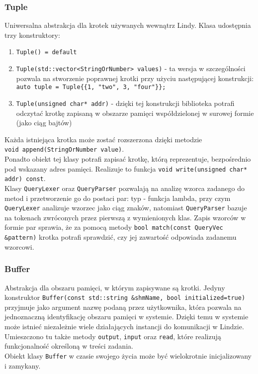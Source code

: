 \documentclass[a4paper]{article}
\begin{document}
	\subsubsection{Tuple}
	Uniwersalna abstrakcja dla krotek używanych wewnątrz Lindy. Klasa udostępnia trzy konstruktory: \\
	\begin{enumerate}
		\item \texttt{Tuple() = default}
		\item \texttt{Tuple(std::vector<StringOrNumber> values)} - ta wersja w szczególności pozwala na stworzenie poprawnej krotki przy użyciu następującej konstrukcji: \texttt{auto tuple = Tuple\{\{1, "two", 3, "four"\}\};}
		\item \texttt{Tuple(unsigned char* addr)} - dzięki tej konstrukcji biblioteka potrafi odczytać krotkę zapisaną w obszarze pamięci współdzielonej w surowej formie (jako ciąg bajtów)
	\end{enumerate}
	Każda istniejąca krotka może zostać rozszerzona dzięki metodzie \\ \texttt{void append(StringOrNumber value)}. \\
	Ponadto obiekt tej klasy potrafi zapisać krotkę, którą reprezentuje, bezpośrednio pod wskazany adres pamięci. Realizuje to funkcja \texttt{void write(unsigned char* addr) const}. \\
	Klasy \texttt{QueryLexer} oraz \texttt{QueryParser} pozwalają na analizę wzorca zadanego do metod i przetworzenie go do postaci par: typ - funkcja lambda, przy czym \texttt{QueryLexer} analizuje wzorzec jako ciąg znaków, natomiast \texttt{QueryParser} bazuje na tokenach zwróconych przez pierwszą z wymienionych klas. Zapis wzorców w formie par sprawia, że za pomocą metody \texttt{bool match(const QueryVec \&pattern)} krotka potrafi sprawdzić, czy jej zawartość odpowiada zadanemu wzorcowi.
	
	\subsubsection{Buffer}
	Abstrakcja dla obszaru pamięci, w którym zapisywane są krotki. Jedyny konstruktor \texttt{Buffer(const std::string \&shmName, bool initialized=true)} przyjmuje jako argument nazwę podaną przez użytkownika, która pozwala na jednoznaczną identyfikację obszaru pamięci w systemie. Dzięki temu w systemie może istnieć niezależnie wiele działających instancji do komunikacji w Lindzie. \\
	Umieszczono tu także metody \texttt{output}, \texttt{input} oraz \texttt{read}, które realizują funkcjonalność określoną w treści zadania. \\
	Obiekt klasy \texttt{Buffer} w czasie swojego życia może być wielokrotnie inicjalizowany i zamykany.
	
\end{document}
